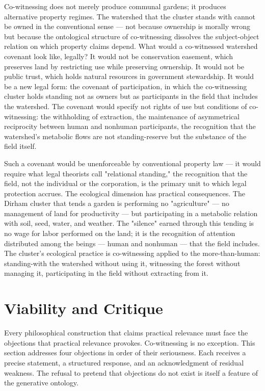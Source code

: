 Co-witnessing does not merely produce communal gardens; it produces alternative property regimes. The watershed that the cluster stands with cannot be owned in the conventional sense — not because ownership is morally wrong but because the ontological structure of co-witnessing dissolves the subject-object relation on which property claims depend. What would a co-witnessed watershed covenant look like, legally? It would not be conservation easement, which preserves land by restricting use while preserving ownership. It would not be public trust, which holds natural resources in government stewardship. It would be a new legal form: the covenant of participation, in which the co-witnessing cluster holds standing not as owners but as participants in the field that includes the watershed. The covenant would specify not rights of use but conditions of co-witnessing: the withholding of extraction, the maintenance of asymmetrical reciprocity between human and nonhuman participants, the recognition that the watershed's metabolic flows are not standing-reserve but the substance of the field itself.

Such a covenant would be unenforceable by conventional property law — it would require what legal theorists call "relational standing," the recognition that the field, not the individual or the corporation, is the primary unit to which legal protection accrues. The ecological dimension has practical consequences. The Dirham cluster that tends a garden is performing no "agriculture" — no management of land for productivity — but participating in a metabolic relation with soil, seed, water, and weather. The "silence" earned through this tending is no wage for labor performed on the land; it is the recognition of attention distributed among the beings — human and nonhuman — that the field includes. The cluster's ecological practice is co-witnessing applied to the more-than-human: standing-with the watershed without using it, witnessing the forest without managing it, participating in the field without extracting from it.

\section{Viability and Critique}

Every philosophical construction that claims practical relevance must face the objections that practical relevance provokes. Co-witnessing is no exception. This section addresses four objections in order of their seriousness. Each receives a precise statement, a structured response, and an acknowledgment of residual weakness. The refusal to pretend that objections do not exist is itself a feature of the generative ontology.

